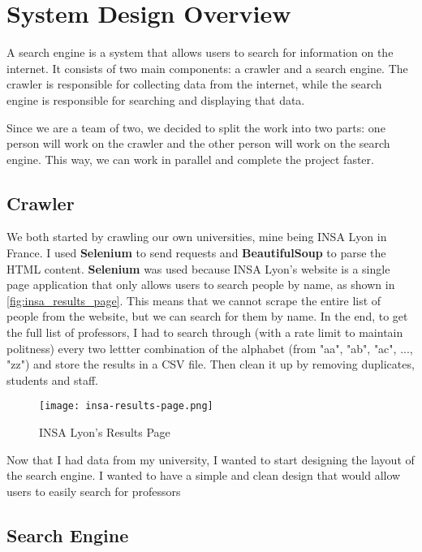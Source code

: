 \section{System Design Overview}

A search engine is a system that allows users to search for information on the internet. It consists of two main components: a crawler and a search engine. The crawler is responsible for collecting data from the internet, while the search engine is responsible for searching and displaying that data.

Since we are a team of two, we decided to split the work into two parts: one person will work on the crawler and the other person will work on the search engine. This way, we can work in parallel and complete the project faster.

\subsection{Crawler}

We both started by crawling our own universities, mine being INSA Lyon in France. I used \textbf{Selenium} to send requests and \textbf{BeautifulSoup} to parse the HTML content. \textbf{Selenium} was used because INSA Lyon's website is a single page application that only allows users to search people by name, as shown in \autoref{fig:insa_results_page}. This means that we cannot scrape the entire list of people from the website, but we can search for them by name. In the end, to get the full list of professors, I had to search through (with a rate limit to maintain politness) every two lettter combination of the alphabet (from "aa", "ab", "ac", ..., "zz") and store the results in a CSV file. Then clean it up by removing duplicates, students and staff.

\begin{figure}[ht]
	\centering
	\texttt{[image: insa-results-page.png]}
	\caption{INSA Lyon's Results Page}
	\label{fig:insa_results_page}
\end{figure}

Now that I had data from my university, I wanted to start designing the layout of the search engine. I wanted to have a simple and clean design that would allow users to easily search for professors

\subsection{Search Engine}

